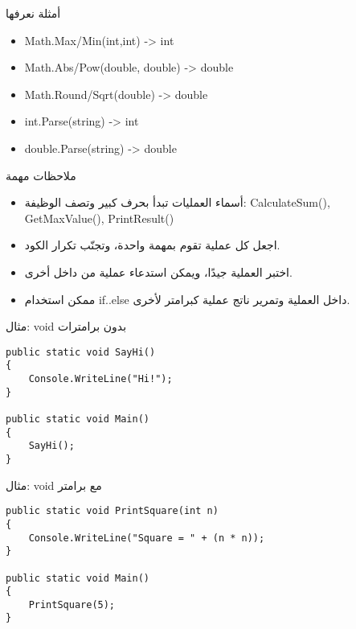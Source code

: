 \documentclass[13pt]{beamer}
\begin{document}
\begin{frame}[fragile]{أمثلة نعرفها}
\begin{english}
\begin{itemize}
  \item \textenglish{Math.Max/Min(int,int) -> int}
  \item \textenglish{Math.Abs/Pow(double, double) -> double}
  \item \textenglish{Math.Round/Sqrt(double) -> double}
  \item \textenglish{int.Parse(string) -> int}
  \item \textenglish{double.Parse(string) -> double}
\end{itemize}
\end{english}
\end{frame}

\begin{frame}[fragile]{ملاحظات مهمة}
\begin{itemize}
  \item أسماء العمليات تبدأ بحرف كبير وتصف الوظيفة: \textenglish{CalculateSum(), GetMaxValue(), PrintResult()}
  \item اجعل كل عملية تقوم بمهمة واحدة، وتجنّب تكرار الكود.
  \item اختبر العملية جيدًا، ويمكن استدعاء عملية من داخل أخرى.
  \item ممكن استخدام \textenglish{if..else} داخل العملية وتمرير ناتج عملية كبرامتر لأخرى.
\end{itemize}
\end{frame}

\begin{frame}[fragile]{مثال: void بدون برامترات}
\begin{english}
\begin{lstlisting}[language=CSharp]
public static void SayHi()
{
    Console.WriteLine("Hi!");
}

public static void Main()
{
    SayHi();
}
\end{lstlisting}
\end{english}
\end{frame}

\begin{frame}[fragile]{مثال: void مع برامتر}
\begin{english}
\begin{lstlisting}[language=CSharp]
public static void PrintSquare(int n)
{
    Console.WriteLine("Square = " + (n * n));
}

public static void Main()
{
    PrintSquare(5);
}
\end{lstlisting}
\end{english}
\end{frame}
\end{document}
